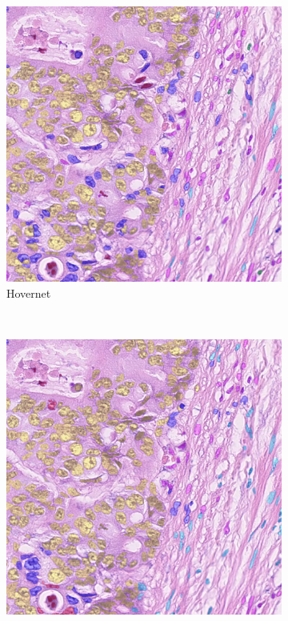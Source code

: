 \begin{figure}[H]
\begin{subfigure}[b]{0.45\textwidth}
    \includegraphics[width=\textwidth]{imgs/qual/consep/hov2.png}
    \caption{Hovernet}
    \label{fig:consep-hov2}
  \end{subfigure}
  \\
  \begin{subfigure}[b]{0.45\textwidth}
    \includegraphics[width=\textwidth]{imgs/qual/consep/gcn-full2.png}

\end{subfigure}
\end{figure}
